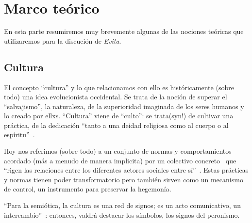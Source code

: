 \section{Marco teórico}

En esta parte resumiremos muy brevemente algunas de las nociones teóricas que utilizaremos para la discución de \textit{Evita}.

\subsection{Cultura}

El concepto ``cultura'' y lo que relacionamos con ello es históricamente (sobre todo) una idea evolucionista occidental.
Se trata de la noción de superar el ``salvajismo'', la naturaleza, de la superioridad imaginada de los seres humanos y lo creado por ellxs.
``Cultura'' viene de ``culto'': se trata(syn!) de cultivar una práctica, de la dedicación ``tanto a una deidad religiosa como al cuerpo o al espíritu''~\autocite[71]{SzIr2009}.

Hoy nos referimos (sobre todo) a un conjunto de normas y comportamientos acordado (más a menudo de manera implicita) por un colectivo concreto~\autocite[52]{GKS2016} que ``rigen las relaciones entre los diferentes actores sociales entre sí''~\autocite[48]{SzIr2009}.
Estas prácticas y normas tienen poder transformatorio pero también sirven como un mecanismo de control, un instrumento para preservar la hegemonía.

``Para la semiótica, la cultura es una red de signos; es un acto comunicativo, un intercambio''~\autocite[71]{SzIr2009}:
entonces, valdrá destacar los símbolos, los signos del peronismo.

